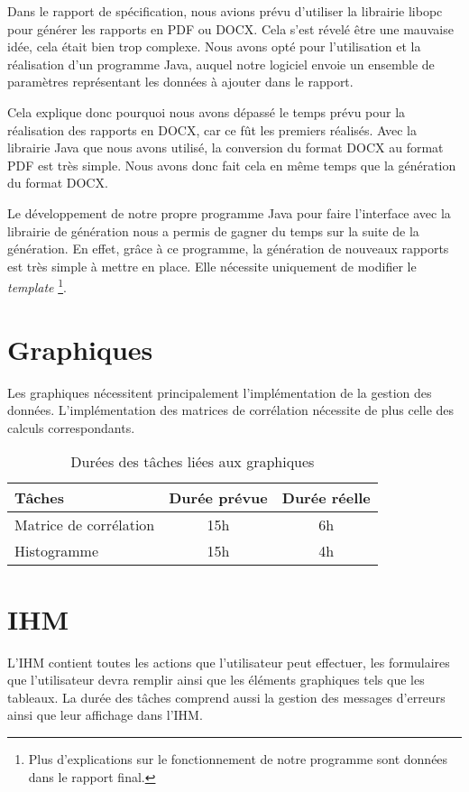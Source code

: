 \documentclass[a4paper]{report}
\begin{document}
Dans le rapport de spécification, nous avions prévu d'utiliser la librairie libopc pour générer les rapports en PDF ou DOCX.
Cela s'est révelé être une mauvaise idée, cela était bien trop complexe.
Nous avons opté pour l'utilisation et la réalisation d'un programme Java, auquel notre logiciel envoie un ensemble de paramètres représentant les données à ajouter dans le rapport.

Cela explique donc pourquoi nous avons dépassé le temps prévu pour la réalisation des rapports en DOCX, car ce fût les premiers réalisés.
Avec la librairie Java que nous avons utilisé, la conversion du format DOCX au format PDF est très simple.
Nous avons donc fait cela en même temps que la génération du format DOCX.

Le développement de notre propre programme Java pour faire l'interface avec la librairie de génération nous a permis de gagner du temps sur la suite de la génération.
En effet, grâce à ce programme, la génération de nouveaux rapports est très simple à mettre en place.
Elle nécessite uniquement de modifier le \textit{template} \footnote{Plus d'explications sur le fonctionnement de notre programme sont données dans le rapport final.}.


\section{Graphiques}

Les graphiques nécessitent principalement l'implémentation de la gestion des données.
L'implémentation des matrices de corrélation nécessite de plus celle des calculs correspondants.

\begin{table}[H]
\centering
  \begin{tabularx}{0.8\textwidth}{| X | c | c |}
    \hline
	Tâches & Durée prévue & Durée réelle \\
    \hline
    Matrice de corrélation &  15h & 6h\\
    Histogramme &  15h & 4h\\
    \hline
  \end{tabularx}
  \caption{Durées des tâches liées aux graphiques}
\end{table}


\section{IHM}

L'IHM contient toutes les actions que l'utilisateur peut effectuer, les formulaires que l'utilisateur devra remplir ainsi que les éléments graphiques tels que les tableaux.
La durée des tâches comprend aussi la gestion des messages d'erreurs ainsi que leur affichage dans l'IHM.
\end{document}
